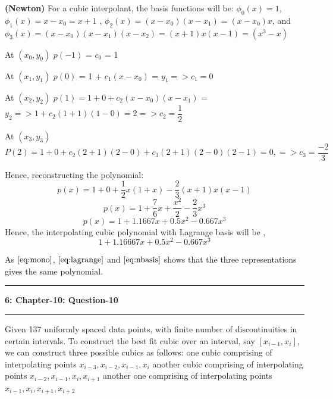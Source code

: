 \documentclass{article}
\newcommand\question[2]{\vspace{.25in}\hrule\textbf{#1: #2}\hrule\vspace{.10in}}
\renewcommand\part[1]{\vspace{.10in}\textbf{(#1)}}
\begin{document}
\part{Newton} For a cubic interpolant, the basis functions will be: \newline
$\phi_0(x) = 1$, $\phi_1(x) = x - x_0 = x+1$ , $\phi_2(x) = (x-x_0)(x-x_1) = (x-x_0)x$, and $\phi_3(x) = (x-x_0)(x-x_1)(x-x_2) = (x+1)x(x-1) = (x^3 - x)$ \newline

	At $(x_0,y_0)$ \newline
	$p(-1)$ = $c_0$ = 1 \newline

	At $(x_1, y_1)$ \newline
	$p(0)$ = 1 + $c_1(x-x_0)$ = $y_1 => c_1 = 0$ \newline

	At $(x_2, y_2)$ \newline
	$p(1) = 1 + 0 + c_2(x-x_0)(x-x_1)$ = $y_2 => 1 + c_2(1+1)(1-0) = 2 => c_2 = \dfrac{1}{2}$  \newline

	At $(x_3, y_3)$ \newline
	$P(2) = 1 + 0 + c_2(2+1)(2-0) + c_3(2+1)(2-0)(2-1) = 0, => c_3 = \dfrac{-2}{3}$ \newline

	Hence, reconstructing the polynomial:
	\[p(x) = 1 + 0 + \dfrac{1}{2}x(1+x) - \dfrac{2}{3}(x+1)x(x-1)\]
	\[p(x) = 1 + \dfrac{7}{6}x + \dfrac{x^2}{2} - \dfrac{2}{3}x^3 \]
	\[p(x) = 1 + 1.1667 x + 0.5 x^2 - 0.667 x^3\]
Hence, the interpolating cubic polynomial with Lagrange basis will be , \newline
\begin{equation}
1 + 1.16667 x + 0.5 x^2 - 0.667x^3 
	\label{eq:nbasis}
\end{equation}

	As $\eqref{eq:mono}$, $\eqref{eq:lagrange}$ and $\eqref{eq:nbasis}$ shows that the three representations gives the same polynomial. \newline


\question{6}{Chapter-10: Question-10}
Given 137 uniformly spaced data points, with finite number of discontinuities in certain intervals. To construct the best fit cubic over an interval, say $[x_{i-1},x_{i}]$, we can construct three possible cubics as follows: \newline
one cubic comprising of interpolating points $x_{i-3},x_{i-2},x_{i-1}, x_i$ \newline
another cubic comprising of interpolating points $x_{i-2}, x_{i-1}, x_i, x_{i+1}$ \newline
another one comprising of interpolating points $x_{i-1}, x_i, x_{i+1}, x_{i+2}$ \newline
\end{document}
